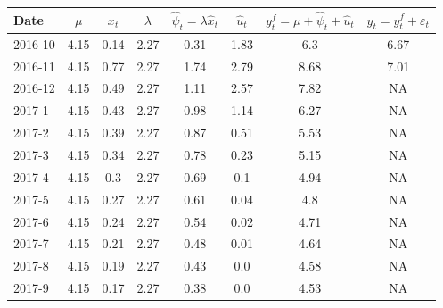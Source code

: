 \begin{tabular}{l || c|ccc|c || cc}
 Date & $\mu$ &$x_{t}$ & $\lambda$ & $ \hat{\psi}_{t} = \lambda \hat{x}_{t}$& $\hat{u}_{t}$ & $y_{t}^{f} = \mu + \hat{\psi}_{t} + \hat{u}_{t} $ & $y_{t} = y_{t}^{f}+\varepsilon_{t}$\\
 \hline\hline	2016-10 & 4.15& 0.14 & 2.27 & 0.31& 1.83 & 6.3 & 6.67 \\
	2016-11 & 4.15& 0.77 & 2.27 & 1.74& 2.79 & 8.68 & 7.01 \\
	2016-12 & 4.15& 0.49 & 2.27 & 1.11& 2.57 & 7.82 & NA \\
	2017-1 & 4.15& 0.43 & 2.27 & 0.98& 1.14 & 6.27 & NA \\
	2017-2 & 4.15& 0.39 & 2.27 & 0.87& 0.51 & 5.53 & NA \\
	2017-3 & 4.15& 0.34 & 2.27 & 0.78& 0.23 & 5.15 & NA \\
	2017-4 & 4.15& 0.3 & 2.27 & 0.69& 0.1 & 4.94 & NA \\
	2017-5 & 4.15& 0.27 & 2.27 & 0.61& 0.04 & 4.8 & NA \\
	2017-6 & 4.15& 0.24 & 2.27 & 0.54& 0.02 & 4.71 & NA \\
	2017-7 & 4.15& 0.21 & 2.27 & 0.48& 0.01 & 4.64 & NA \\
	2017-8 & 4.15& 0.19 & 2.27 & 0.43& 0.0 & 4.58 & NA \\
	2017-9 & 4.15& 0.17 & 2.27 & 0.38& 0.0 & 4.53 & NA \\
 \hline
\end{tabular}
